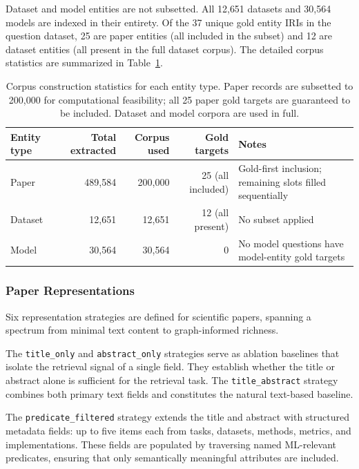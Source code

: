 Dataset and model entities are not subsetted.
All 12{,}651 datasets and 30{,}564 models are indexed in their entirety.
Of the 37 unique gold entity IRIs in the question dataset, 25 are paper
entities (all included in the subset) and 12 are dataset entities (all present
in the full dataset corpus).
The detailed corpus statistics are summarized in
Table~\ref{tab:corpus_stats}.

\begin{table}[htbp]
  \centering
  \caption{Corpus construction statistics for each entity type. Paper records
    are subsetted to 200{,}000 for computational feasibility; all 25 paper
    gold targets are guaranteed to be included. Dataset and model corpora are
    used in full.}
  \label{tab:corpus_stats}
  \begin{tabular}{lrrrp{5cm}}
    \toprule
    Entity type & Total extracted & Corpus used & Gold targets & Notes \\
    \midrule
    Paper   & 489{,}584 & 200{,}000 & 25 (all included) &
              Gold-first inclusion; remaining slots filled sequentially \\
    Dataset & 12{,}651  & 12{,}651  & 12 (all present)  &
              No subset applied \\
    Model   & 30{,}564  & 30{,}564  & 0                 &
              No model questions have model-entity gold targets \\
    \bottomrule
  \end{tabular}
\end{table}
  
\subsubsection{Paper Representations}
\label{subsubsec:paper_representations}

Six representation strategies are defined for scientific papers, spanning a
spectrum from minimal text content to graph-informed richness.

The \texttt{title\_only} and \texttt{abstract\_only} strategies serve as
ablation baselines that isolate the retrieval signal of a single field.
They establish whether the title or abstract alone is sufficient for the
retrieval task.
The \texttt{title\_abstract} strategy combines both primary text fields and
constitutes the natural text-based baseline.

The \texttt{predicate\_filtered} strategy extends the title and abstract with
structured metadata fields: up to five items each from tasks, datasets,
methods, metrics, and implementations.
These fields are populated by traversing named ML-relevant predicates,
ensuring that only semantically meaningful attributes are included.

